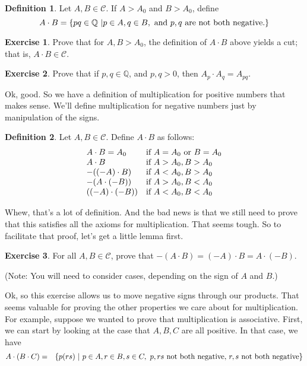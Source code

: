 \documentclass{article}
\theoremstyle{definition}
\newtheorem{definition}{Definition}
\newtheorem{exercise}{Exercise}
\newcommand{\Q}{\mathbb{Q}}
\begin{document}
\begin{definition}
Let $A, B\in \mathcal{C}$. If $A> A_0$ and $B> A_0$, define 
\[A\cdot B = \{pq\in \Q\ | p\in A, q\in B, \hbox{ and }p, q\hbox{ are not both negative}.\}\]
\end{definition}

\begin{exercise}
Prove that for $A, B> A_0$, the definition of $A\cdot B$ above yields a cut; that is, $A\cdot B\in \mathcal{C}$.
\end{exercise}

\begin{exercise}
Prove that if $p, q\in \Q$, and $p, q> 0$, then $A_p\cdot A_q = A_{pq}$.
\end{exercise}

Ok, good. So we have a definition of multiplication for positive numbers that makes sense. We'll define multiplication for negative numbers just by manipulation of the signs.

\begin{definition}
Let $A, B\in \mathcal{C}$. Define $A\cdot B$ as follows:
\[\begin{array}{ll} A\cdot B = A_0 & \hbox{if }A=A_0 \hbox{ or }B=A_0\\A\cdot B & \hbox{if }A> A_0, B> A_0\\-((-A)\cdot B) & \hbox{if }A<A_0, B> A_0\\-(A\cdot (-B)) & \hbox{if }A> A_0, B<A_0\\((-A)\cdot (-B)) & \hbox{if }A<A_0, B<A_0\end{array}\]
\end{definition}

Whew, that's a lot of definition. And the bad news is that we still need to prove that this satisfies all the axioms for multiplication. That seems tough. So to facilitate that proof, let's get a little lemma first.

\begin{exercise}\label{negmove}
For all $A, B\in \mathcal{C}$, prove that $-(A\cdot B) = (-A)\cdot B=A\cdot(-B)$.

(Note: You will need to consider cases, depending on the sign of $A$ and $B$.)
\end{exercise}

Ok, so this exercise allows us to move negative signs through our products. That seems valuable for proving the other properties we care about for multiplication. For example, suppose we wanted to prove that multiplication is associative. First, we can start by looking at the case that $A, B, C$ are all positive. In that case, we have
\begin{eqnarray*}
A\cdot (B\cdot C) &=& \{p(rs)\ | \ p\in A, r\in B, s\in C,\ p, rs\hbox{ not both negative, $r, s$ not both negative}\}
\end{eqnarray*}
\end{document}
